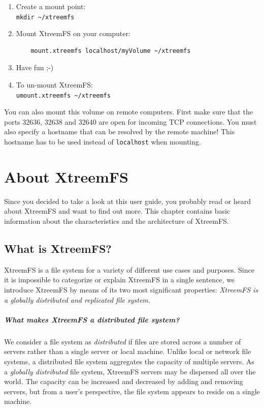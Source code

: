 \documentclass[a4paper,10pt]{book}
\begin{document}
\begin{enumerate}
\item Create a mount point:\\
	\texttt{mkdir \~{}/xtreemfs}

\item Mount XtreemFS on your computer:
	\begin{verbatim}
	mount.xtreemfs localhost/myVolume ~/xtreemfs
	\end{verbatim}


\item Have fun ;-)

\item To un-mount XtreemFS:\\
	\texttt{umount.xtreemfs \~{}/xtreemfs}
\end{enumerate}

You can also mount this volume on remote computers. First make sure that the ports 32636, 32638 and 32640 are open for incoming TCP connections. You must also specify a hostname that can be resolved by the remote machine! This hostname has to be used instead of \texttt{localhost} when mounting.

\chapter{About XtreemFS}
\setcounter{page}{1}

Since you decided to take a look at this user guide, you probably read or heard about XtreemFS and want to find out more. This chapter contains basic information about the characteristics and the architecture of XtreemFS.

\section{What is XtreemFS?}
XtreemFS is a file system for a variety of different use cases and purposes. Since it is impossible to categorize or explain XtreemFS in a single sentence, we introduce XtreemFS by means of its two most significant properties: \emph{XtreemFS is a globally distributed and replicated file system.}

\paragraph{What makes XtreemFS a distributed file system?} We consider a file system as \emph{distributed} if files are stored across a number of servers rather than a single server or local machine. Unlike local or network file systems, a distributed file system aggregates the capacity of multiple servers. As a \emph{globally distributed} file system, XtreemFS servers may be dispersed all over the world. The capacity can be increased and decreased by adding and removing servers, but from a user's perspective, the file system appears to reside on a single machine.
\end{document}

